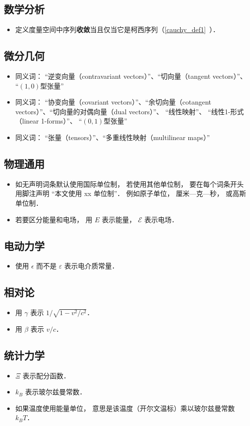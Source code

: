 \subsection{数学分析}
\begin{itemize}
\item 定义度量空间中序列\textbf{收敛}当且仅当它是柯西序列（\autoref{cauchy_def1}~）．
\end{itemize}

\subsection{微分几何}
\begin{itemize}
\item 同义词： “逆变向量（contravariant vectors）”、“切向量（tangent vectors）”、 “$(1, 0)$型张量”
\item 同义词： “协变向量（covariant vectors）”、“余切向量（cotangent vectors）”、“切向量的对偶向量（dual vectors）”、 “线性映射”、 “线性1-形式（linear 1-forms）”、 “$(0, 1)$型张量”
\item 同义词： “张量（tensors）”、“多重线性映射（multilinear maps）”
\end{itemize}

\subsection{物理通用}
\begin{itemize}
\item 如无声明词条默认使用国际单位制， 若使用其他单位制， 要在每个词条开头用脚注声明 “本文使用 xx 单位制”． 例如原子单位， 厘米—克—秒， 或高斯单位制．
\item 若要区分能量和电场， 用 $E$ 表示能量， $\mathcal E$ 表示电场．
\end{itemize}

\subsection{电动力学}
\begin{itemize}
\item 使用 $\epsilon$ 而不是 $\varepsilon$ 表示电介质常量．
\end{itemize}

\subsection{相对论}
\begin{itemize}
\item 用 $\gamma$ 表示 $1/\sqrt{1 - v^2/c^2}$．
\item 用 $\beta$ 表示 $v/c$．
\end{itemize}

\subsection{统计力学}
\begin{itemize}
\item $\Xi$ 表示配分函数．
\item $k_B$ 表示玻尔兹曼常数．
\item 如果温度使用能量单位， 意思是该温度（开尔文温标）乘以玻尔兹曼常数 $k_B T$．
\end{itemize}
